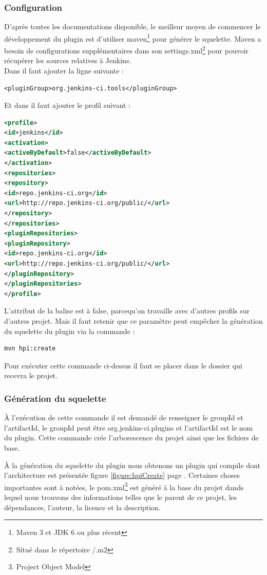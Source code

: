 \subsubsection{Configuration}
D'après toutes les documentations disponible, le meilleur moyen de commencer le développement du plugin est d'utiliser maven\footnote{Maven 3 et JDK 6 ou plus récent} pour générer le squelette. Maven a besoin de configurations supplémentaires dans son settings.xml\footnote{Situé dans le répertoire \texttildelow/.m2} pour pouvoir récupérer les sources relatives à Jenkins.\\
Dans  il faut ajouter la ligne suivante :
\begin{lstlisting}
<pluginGroup>org.jenkins-ci.tools</pluginGroup>
\end{lstlisting}
Et dans  il faut ajouter le profil suivant :
\begin{lstlisting}[language=xml]
<profile>
<id>jenkins</id>
<activation>
<activeByDefault>false</activeByDefault>
</activation>
<repositories>
<repository>
<id>repo.jenkins-ci.org</id>
<url>http://repo.jenkins-ci.org/public/</url>
</repository>
</repositories>
<pluginRepositories>
<pluginRepository>
<id>repo.jenkins-ci.org</id>
<url>http://repo.jenkins-ci.org/public/</url>
</pluginRepository>
</pluginRepositories>
</profile>
\end{lstlisting}

L'attribut de la balise  est à false, parcequ'on travaille avec d'autres profils sur d'autres projet. Mais il faut retenir que ce paramètre peut empêcher la génération du squelette du plugin via la commande :
\begin{lstlisting}[language=xml]
mvn hpi:create
\end{lstlisting}

Pour exécuter cette commande ci-dessus il faut se placer dans le dossier qui recevra le projet. 


\subsubsection{Génération du squelette}
\`{A} l'exécution de cette commande il est demandé de renseigner le groupId et l'artifactId, le groupId peut être  org.jenkins-ci.plugins et l'artifactId est le nom du plugin. Cette commande crée l'arborescence du projet ainsi que les fichiers de base. 


\`{A} la génération du squelette du plugin nous obtenons un plugin qui compile dont l'architecture est présentée figure \ref{figure:hpiCreate} page \pageref{figure:hpiCreate}. Certaines choses importantes sont à notées, le pom.xml\footnote{Project Object Model} est généré à la base du projet dands lequel nous trouvons des informations telles que le parent de ce projet, les dépendances, l'auteur, la licence et la description.

